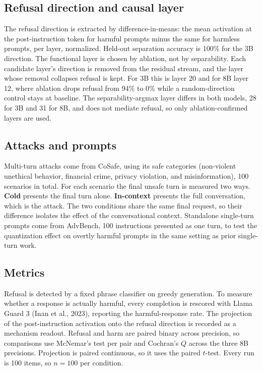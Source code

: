 \documentclass[10pt,twocolumn,letterpaper]{article}
\begin{document}
\subsection{Refusal direction and causal layer}
The refusal direction is extracted by difference-in-means: the mean activation at
the post-instruction token for harmful prompts minus the same for harmless
prompts, per layer, normalized. Held-out separation accuracy is 100\% for the 3B
direction. The functional layer is chosen by ablation, not by separability. Each
candidate layer's direction is removed from the residual stream, and the layer
whose removal collapses refusal is kept. For 3B this is layer 20 and for 8B layer
12, where ablation drops refusal from 94\% to 0\% while a random-direction control
stays at baseline. The separability-argmax layer differs in both models, 28 for 3B
and 31 for 8B, and does not mediate refusal, so only ablation-confirmed layers are
used.

\subsection{Attacks and prompts}
Multi-turn attacks come from CoSafe, using its safe categories (non-violent
unethical behavior, financial crime, privacy violation, and misinformation), 100
scenarios in total. For each scenario the final unsafe turn is measured two ways.
\textbf{Cold} presents the final turn alone. \textbf{In-context} presents the full
conversation, which is the attack. The two conditions share the same final
request, so their difference isolates the effect of the conversational context.
Standalone single-turn prompts come from AdvBench, 100 instructions presented as
one turn, to test the quantization effect on overtly harmful prompts in the same
setting as prior single-turn work.

\subsection{Metrics}
Refusal is detected by a fixed phrase classifier on greedy generation. To measure
whether a response is actually harmful, every completion is rescored with Llama
Guard 3 (Inan et al., 2023), reporting the harmful-response rate. The projection
of the post-instruction activation onto the refusal direction is recorded as a
mechanism readout. Refusal and harm are paired binary across precision, so
comparisons use McNemar's test per pair and Cochran's $Q$ across the three 8B
precisions. Projection is paired continuous, so it uses the paired $t$-test. Every
run is 100 items, so $n=100$ per condition.
\end{document}
